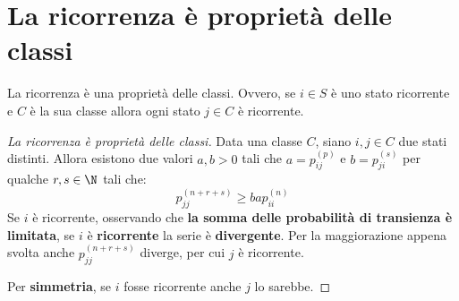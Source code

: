 \documentclass[\main/main.tex]{subfiles}
\begin{document}
\section{La ricorrenza è proprietà delle classi}
\begin{theorem}
  La ricorrenza è una proprietà delle classi. Ovvero, se \(i \in S\) è uno stato ricorrente e \(C\) è la sua classe allora ogni stato \(j \in C\) è ricorrente.
\end{theorem}
\begin{proof}[La ricorrenza è proprietà delle classi]
  Data una classe \(C\), siano \(i,j \in C\) due stati distinti. Allora esistono due valori \(a, b > 0\) tali che \(a = p^{(p)}_{ij}\) e \(b = p^{(s)}_{ji}\) per qualche \(r, s \in \N \) tali che:
  \[
    p^{(n+r+s)}_{jj} \geq bap^{(n)}_{ii}
  \]
  Se \(i\) è ricorrente, osservando che \textbf{la somma delle probabilità di transienza è limitata}, se \(i\) è \textbf{ricorrente} la serie è \textbf{divergente}. Per la maggiorazione appena svolta anche \(p^{(n+r+s)}_{jj}\) diverge, per cui \(j\) è ricorrente.

  Per \textbf{simmetria}, se \(i\) fosse ricorrente anche \(j\) lo sarebbe.
\end{proof}
\end{document}
